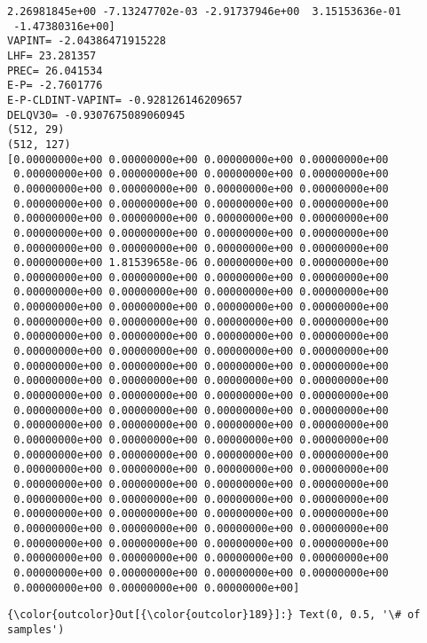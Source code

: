 \documentclass[11pt]{article}
\begin{document}
\begin{Verbatim}[commandchars=\\\{\}]
  2.26981845e+00 -7.13247702e-03 -2.91737946e+00  3.15153636e-01
 -1.47380316e+00]
VAPINT= -2.04386471915228
LHF= 23.281357
PREC= 26.041534
E-P= -2.7601776
E-P-CLDINT-VAPINT= -0.928126146209657
DELQV30= -0.9307675089060945
(512, 29)
(512, 127)
[0.00000000e+00 0.00000000e+00 0.00000000e+00 0.00000000e+00
 0.00000000e+00 0.00000000e+00 0.00000000e+00 0.00000000e+00
 0.00000000e+00 0.00000000e+00 0.00000000e+00 0.00000000e+00
 0.00000000e+00 0.00000000e+00 0.00000000e+00 0.00000000e+00
 0.00000000e+00 0.00000000e+00 0.00000000e+00 0.00000000e+00
 0.00000000e+00 0.00000000e+00 0.00000000e+00 0.00000000e+00
 0.00000000e+00 0.00000000e+00 0.00000000e+00 0.00000000e+00
 0.00000000e+00 1.81539658e-06 0.00000000e+00 0.00000000e+00
 0.00000000e+00 0.00000000e+00 0.00000000e+00 0.00000000e+00
 0.00000000e+00 0.00000000e+00 0.00000000e+00 0.00000000e+00
 0.00000000e+00 0.00000000e+00 0.00000000e+00 0.00000000e+00
 0.00000000e+00 0.00000000e+00 0.00000000e+00 0.00000000e+00
 0.00000000e+00 0.00000000e+00 0.00000000e+00 0.00000000e+00
 0.00000000e+00 0.00000000e+00 0.00000000e+00 0.00000000e+00
 0.00000000e+00 0.00000000e+00 0.00000000e+00 0.00000000e+00
 0.00000000e+00 0.00000000e+00 0.00000000e+00 0.00000000e+00
 0.00000000e+00 0.00000000e+00 0.00000000e+00 0.00000000e+00
 0.00000000e+00 0.00000000e+00 0.00000000e+00 0.00000000e+00
 0.00000000e+00 0.00000000e+00 0.00000000e+00 0.00000000e+00
 0.00000000e+00 0.00000000e+00 0.00000000e+00 0.00000000e+00
 0.00000000e+00 0.00000000e+00 0.00000000e+00 0.00000000e+00
 0.00000000e+00 0.00000000e+00 0.00000000e+00 0.00000000e+00
 0.00000000e+00 0.00000000e+00 0.00000000e+00 0.00000000e+00
 0.00000000e+00 0.00000000e+00 0.00000000e+00 0.00000000e+00
 0.00000000e+00 0.00000000e+00 0.00000000e+00 0.00000000e+00
 0.00000000e+00 0.00000000e+00 0.00000000e+00 0.00000000e+00
 0.00000000e+00 0.00000000e+00 0.00000000e+00 0.00000000e+00
 0.00000000e+00 0.00000000e+00 0.00000000e+00 0.00000000e+00
 0.00000000e+00 0.00000000e+00 0.00000000e+00 0.00000000e+00
 0.00000000e+00 0.00000000e+00 0.00000000e+00]

    \end{Verbatim}

\begin{Verbatim}[commandchars=\\\{\}]
{\color{outcolor}Out[{\color{outcolor}189}]:} Text(0, 0.5, '\# of samples')
\end{Verbatim}
            
    \begin{center}
    \end{center}
    { \hspace*{\fill} \\}
    
\end{document}
